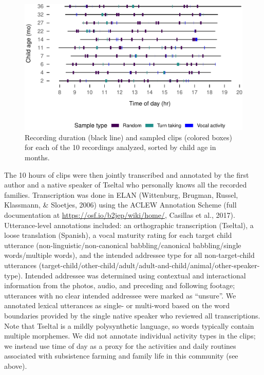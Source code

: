 \documentclass[,man,floatsintext]{apa6}
\begin{document}
\begin{figure}
\centering
\includegraphics{Tseltal-CLE_files/figure-latex/fig2-1.pdf}
\caption{\label{fig:fig2}Recording duration (black line) and sampled clips
(colored boxes) for each of the 10 recordings analyzed, sorted by child
age in months.}
\end{figure}

The 10 hours of clips were then jointly transcribed and annotated by the
first author and a native speaker of Tseltal who personally knows all
the recorded families. Transcription was done in ELAN (Wittenburg,
Brugman, Russel, Klassmann, \& Sloetjes, 2006) using the ACLEW
Annotation Scheme (full documentation at
\url{https://osf.io/b2jep/wiki/home/}, Casillas et al., 2017).
Utterance-level annotations included: an orthographic transcription
(Tseltal), a loose translation (Spanish), a vocal maturity rating for
each target child utterance (non-linguistic/non-canonical
babbling/canonical babbling/single words/multiple words), and the
intended addressee type for all non-target-child utterances
(target-child/other-child/adult/adult-and-child/animal/other-speaker-type).
Intended addressee was determined using contextual and interactional
information from the photos, audio, and preceding and following footage;
utterances with no clear intended addressee were marked as
\enquote{unsure}. We annotated lexical utterances as single- or
multi-word based on the word boundaries provided by the single native
speaker who reviewed all transcriptions. Note that Tseltal is a mildly
polysynthetic language, so words typically contain multiple morphemes.
We did not annotate individual activity types in the clips; we instead
use time of day as a proxy for the activities and daily routines
associated with subsistence farming and family life in this community
(see above).
\end{document}
